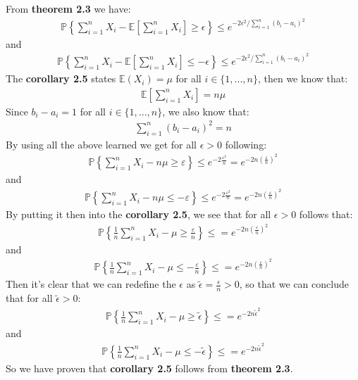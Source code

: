From \textbf{theorem 2.3} we have:
\begin{align}
\mathbb{P}\left\{ \sum_{i=1}^n X_i - \mathbb{E}\left[ \sum_{i=1}^n X_i \right] \geq \epsilon \right\} \leq e^{-2 \epsilon^2 / \sum_{i=1}^n (b_i - a_i)^2}
\end{align}
and
\begin{align}
\mathbb{P}\left\{ \sum_{i=1}^n X_i - \mathbb{E}\left[ \sum_{i=1}^n X_i \right] \leq - \epsilon \right\} \leq e^{-2 \epsilon^2 / \sum_{i=1}^n (b_i - a_i)^2}
\end{align}
The \textbf{corollary 2.5} states $\mathbb{E}(X_i) = \mu$ for all $i \in \{1, ..., n\}$, then we know that:
\begin{align}
\mathbb{E}\left[ \sum_{i=1}^n X_i \right] = n\mu 
\end{align}
Since $b_i - a_i = 1$ for all $i \in \{1, ..., n\}$, we also know that:
\begin{align}
\sum_{i=1}^n (b_i - a_i)^2 = n 
\end{align}
By using all the above learned we get for all $\epsilon > 0$ following:
\begin{align}
\mathbb{P}\left\{ \sum_{i=1}^n X_i - n\mu \geq \varepsilon \right\} \leq e^{- 2 \frac{\varepsilon^2}{n} } = e^{- 2n \left( \frac{ \varepsilon}{n} \right)^2 }
\end{align}
and
\begin{align}
\mathbb{P}\left\{ \sum_{i=1}^n X_i - n\mu \leq -\varepsilon \right\} \leq e^{- 2 \frac{\varepsilon^2}{n} } = e^{- 2n \left( \frac{ \varepsilon}{n} \right)^2 }
\end{align}
By putting it then into the \textbf{corollary 2.5}, we see that for all $\epsilon > 0$ follows that:
\begin{align}
\mathbb{P}\left\{\frac{1}{n} \sum_{i=1}^n X_i - \mu \geq \frac{\varepsilon}{n} \right\} \leq = e^{- 2n \left( \frac{ \varepsilon}{n} \right)^2 }
\end{align}
and
\begin{align}
\mathbb{P}\left\{\frac{1}{n} \sum_{i=1}^n X_i - \mu \leq- \frac{\varepsilon}{n} \right\} \leq = e^{- 2n \left( \frac{ \varepsilon}{n} \right)^2 }
\end{align}
Then it's clear that we can redefine the $\epsilon$ as $\tilde{\epsilon} = \frac{\epsilon}{n} > 0$, so that we can conclude that for all $\tilde{\epsilon}>0$:
\begin{align}
\mathbb{P}\left\{\frac{1}{n} \sum_{i=1}^n X_i - \mu \geq \tilde{\epsilon} \right\} \leq = e^{- 2n \tilde{\epsilon}^2 }
\end{align}
and
\begin{align}
\mathbb{P}\left\{\frac{1}{n} \sum_{i=1}^n X_i - \mu \leq - \tilde{\epsilon} \right\} \leq = e^{- 2n \tilde{\epsilon}^2 }
\end{align}
So we have proven that \textbf{corollary 2.5} follows from \textbf{theorem 2.3}.